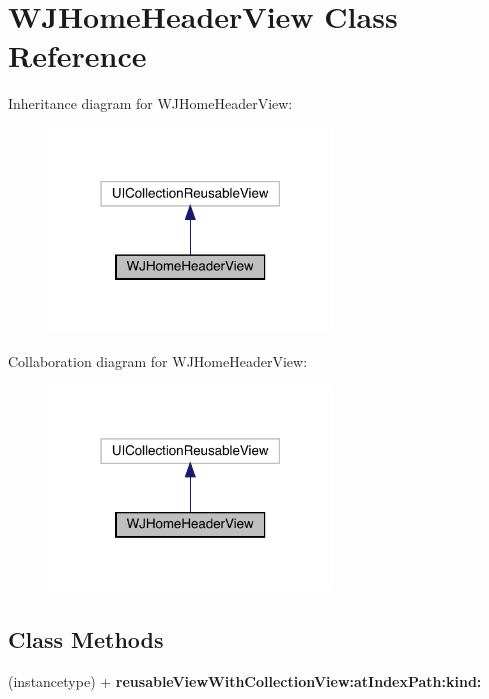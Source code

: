 \hypertarget{interface_w_j_home_header_view}{}\section{W\+J\+Home\+Header\+View Class Reference}
\label{interface_w_j_home_header_view}


Inheritance diagram for W\+J\+Home\+Header\+View\+:\nopagebreak
\begin{figure}[H]
\begin{center}
\leavevmode
\includegraphics[width=214pt]{interface_w_j_home_header_view__inherit__graph}
\end{center}
\end{figure}


Collaboration diagram for W\+J\+Home\+Header\+View\+:\nopagebreak
\begin{figure}[H]
\begin{center}
\leavevmode
\includegraphics[width=214pt]{interface_w_j_home_header_view__coll__graph}
\end{center}
\end{figure}
\subsection*{Class Methods}
\begin{DoxyCompactItemize}
\item 
\mbox{\label{interface_w_j_home_header_view_ac0b383acb3d6107ebaba370edd7a95eb}} 
(instancetype) + {\bfseries reusable\+View\+With\+Collection\+View\+:at\+Index\+Path\+:kind\+:}
\end{DoxyCompactItemize}
